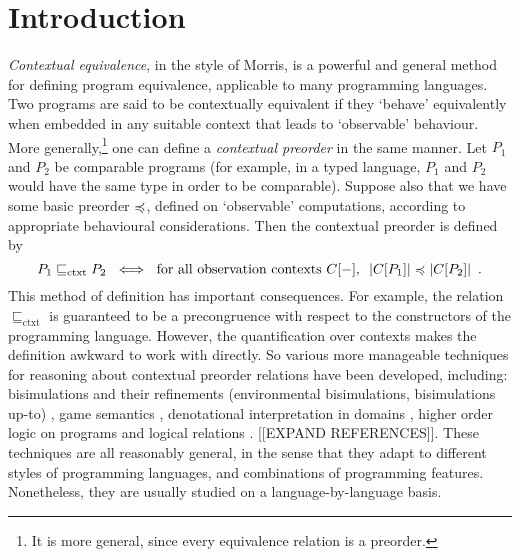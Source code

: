\section{Introduction}



\emph{Contextual equivalence}, in the style of Morris,
is a powerful and general method for defining program equivalence, applicable to many 
programming languages. 
Two programs are said to be contextually equivalent if 
they `behave' equivalently when embedded in any suitable context that leads to `observable' behaviour. 
More generally,\footnote{It is more general, since every equivalence relation is a preorder.} one can define a \emph{contextual preorder} in the same manner. Let $P_1$ and $P_2$ be comparable programs (for example, in a typed language, $P_1$ and $P_2$ would  have the same type in order to be comparable). Suppose also that we have some {basic preorder} $\preccurlyeq$, defined on `observable' computations, according to appropriate behavioural considerations. Then the contextual preorder is defined by
\begin{equation}
\label{equation:contextual-preorder}
P_1 \sqsubseteq_\text{ctxt} P_2 ~ \iff ~
\text{for all observation contexts $C[-]$, $~ |C[P_1]| \preccurlyeq |C[P_2]|$} \enspace . 
\end{equation}
This method of definition has important consequences. For example, the relation
$\sqsubseteq_\text{ctxt}$ is guaranteed to be a precongruence with respect 
to the constructors of the programming language.
However, the quantification over contexts makes the definition awkward to work with directly.
So various more manageable techniques for reasoning about contextual preorder relations have been developed, including:
 bisimulations 
and their refinements (environmental bisimulations, 
bisimulations up-to) \cite{koutavas2011applicative}, 
game semantics \cite{abramsky1999game}, 
denotational interpretation in domains \cite{scott1982domains}, 
higher order logic on 
programs \cite{honda2005observationally} 
and logical relations \cite{Pitts2000}. [[EXPAND REFERENCES]].
These techniques are all reasonably general, in the sense that they adapt to different styles of programming languages, and combinations of programming features. Nonetheless, they are usually studied on a language-by-language basis.

